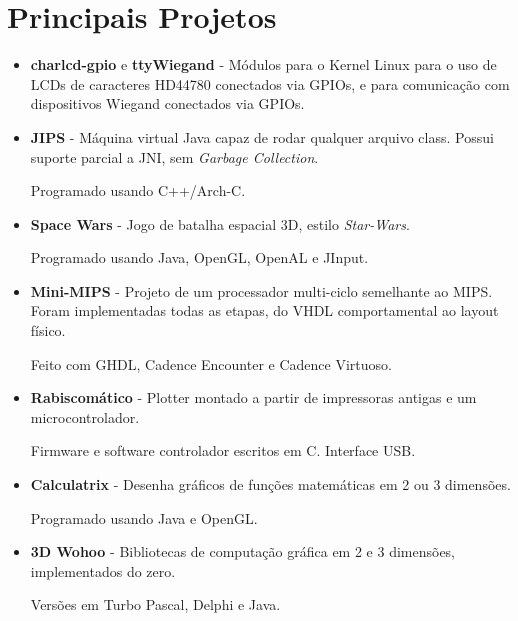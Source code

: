 \documentclass[a4paper,10pt]{article}
\begin{document}
  \section{Principais Projetos}
    \begin{itemize}
      \item 
        \textbf{charlcd-gpio} e \textbf{ttyWiegand} - Módulos para o Kernel Linux para o uso de LCDs de caracteres HD44780 conectados via GPIOs, e para comunicação com dispositivos Wiegand conectados via GPIOs.

      \item 
        \textbf{JIPS} - Máquina virtual Java capaz de rodar qualquer arquivo class. Possui suporte parcial a JNI, sem \emph{Garbage Collection}.

        Programado usando C++/Arch-C.

      \item 
        \textbf{Space Wars} - Jogo de batalha espacial 3D, estilo \emph{Star-Wars}.

        Programado usando Java, OpenGL, OpenAL e JInput.

      \item 
        \textbf{Mini-MIPS} - Projeto de um processador multi-ciclo semelhante ao MIPS. Foram implementadas todas as etapas, do VHDL comportamental ao layout físico.

        Feito com GHDL, Cadence Encounter e Cadence Virtuoso.

      \item 
        \textbf{Rabiscomático} - Plotter montado a partir de impressoras antigas e um microcontrolador.

        Firmware e software controlador escritos em C. Interface USB.

      \item 
        \textbf{Calculatrix} - Desenha gráficos de funções matemáticas em 2 ou 3 dimensões.

        Programado usando Java e OpenGL.

      \item 
        \textbf{3D Wohoo} - Bibliotecas de computação gráfica em 2 e 3 dimensões, implementados do zero.

        Versões em Turbo Pascal, Delphi e Java.
    \end{itemize}
\end{document}

